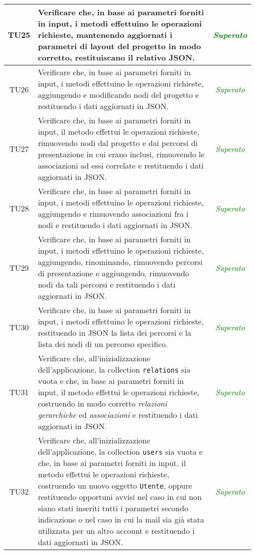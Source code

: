 \begin{longtable}{|c|>{}m{8cm}|c|}
\hypertarget{TU25}{TU25} & Verificare che, in base ai parametri forniti in input, i metodi effettuino le operazioni richieste, mantenendo aggiornati i parametri di layout del progetto in modo corretto, restituiscano il relativo JSON\finaleTestUnita{}. & \textcolor{Green}{\textit{Superato}}\\ \hline
\hypertarget{TU26}{TU26} & Verificare che, in base ai parametri forniti in input, i metodi effettuino le operazioni richieste, aggiungendo e modificando nodi del progetto e restituendo i dati aggiornati in JSON\finaleTestUnita{}. & \textcolor{Green}{\textit{Superato}}\\ \hline
\hypertarget{TU27}{TU27} & Verificare che, in base ai parametri forniti in input, il metodo effettui le operazioni richieste, rimuovendo nodi dal progetto e dai percorsi di presentazione in cui erano inclusi, rimuovendo le associazioni ad essi correlate e restituendo i dati aggiornati in JSON\finaleTestUnita{}. & \textcolor{Green}{\textit{Superato}}\\ \hline
\hypertarget{TU28}{TU28} & Verificare che, in base ai parametri forniti in input, i metodi effettuino le operazioni richieste, aggiungendo e rimuovendo associazioni fra i nodi e restituendo i dati aggiornati in JSON\finaleTestUnita{}. & \textcolor{Green}{\textit{Superato}}\\ \hline
\hypertarget{TU29}{TU29} & Verificare che, in base ai parametri forniti in input, i metodi effettuino le operazioni richieste, aggiungendo, rinominando, rimuovendo percorsi di presentazione e aggiungendo, rimuovendo nodi da tali percorsi e restituendo i dati aggiornati in JSON\finaleTestUnita{}. & \textcolor{Green}{\textit{Superato}}\\ \hline
\hypertarget{TU30}{TU30} & Verificare che, in base ai parametri forniti in input, i metodi effettuino le operazioni richieste, restituendo in JSON la lista dei percorsi e la lista dei nodi di un percorso specifico\finaleTestUnita{}. & \textcolor{Green}{\textit{Superato}}\\ \hline
\hypertarget{TU31}{TU31} & Verificare che, all'inizializzazione dell'applicazione, la collection \texttt{relations} sia vuota e che, in base ai parametri forniti in input, il metodo effettui le operazioni richieste, costruendo in modo corretto \textit{relazioni gerarchiche} ed \textit{associazioni}  e  restituendo i dati aggiornati in JSON\finaleTestUnita{}. & \textcolor{Green}{\textit{Superato}}\\ \hline
\hypertarget{TU32}{TU32} & Verificare che, all'inizializzazione dell'applicazione, la collection \texttt{users} sia vuota e che, in base ai parametri forniti in input, il metodo effettui le operazioni richieste, costruendo un nuovo oggetto \texttt{Utente}, oppure restituendo opportuni avvisi nel caso in cui non siano stati inseriti tutti i parametri secondo indicazione o nel caso in cui la mail sia già stata utilizzata per un altro account e  restituendo i dati aggiornati in JSON\finaleTestUnita{}. & \textcolor{Green}{\textit{Superato}}\\ \hline

\end{longtable}
